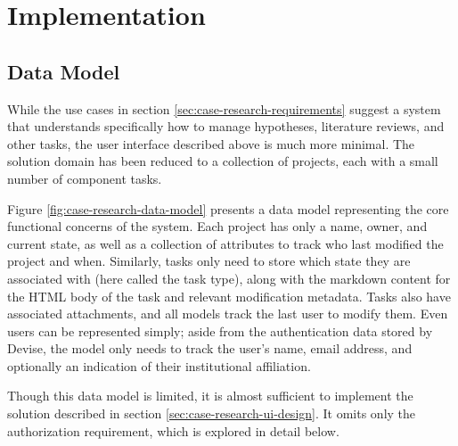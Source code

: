\documentclass[document.tex]{subfiles}
\begin{document}
\FloatBarrier

\section {Implementation}



\subsection {Data Model}

While the use cases in section \ref{sec:case-research-requirements} suggest a system that understands specifically how to manage hypotheses, literature reviews, and other tasks, the user interface described above is much more minimal. The solution domain has been reduced to a collection of projects, each with a small number of component tasks.

Figure \ref{fig:case-research-data-model} presents a data model representing the core functional concerns of the system. Each project has only a name, owner, and current state, as well as a collection of attributes to track who last modified the project and when. Similarly, tasks only need to store which state they are associated with (here called the task type), along with the markdown content for the HTML body of the task and relevant modification metadata. Tasks also have associated attachments, and all models track the last user to modify them. Even users can be represented simply; aside from the authentication data stored by Devise, the model only needs to track the user's name, email address, and optionally an indication of their institutional affiliation.

Though this data model is limited, it is almost sufficient to implement the solution described in section \ref{sec:case-research-ui-design}. It omits only the authorization requirement, which is explored in detail below.
\end{document}
